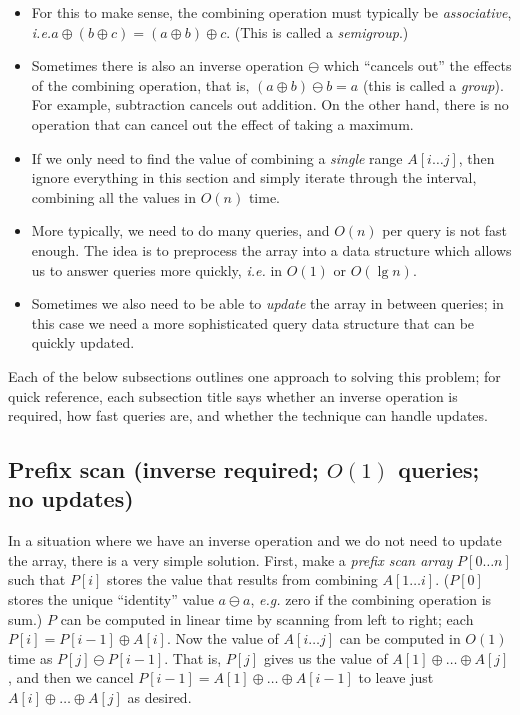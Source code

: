 \documentclass[10pt]{book}
\newcommand{\eg}{\emph{e.g.}\xspace}
\newcommand{\ie}{\emph{i.e.}\xspace}
\begin{document}
\begin{itemize}
\item For this to make sense, the combining operation must typically
  be \emph{associative}, \ie $a \oplus (b \oplus c) = (a \oplus b) \oplus
  c$.  (This is called a \emph{semigroup}.)
\item Sometimes there is also an inverse operation $\ominus$ which
  ``cancels out'' the effects of the combining operation, that is, $(a
  \oplus b) \ominus b = a$ (this is called a \emph{group}).  For
  example, subtraction cancels out addition. On the other hand, there
  is no operation that can cancel out the effect of taking a maximum.
\item If we only need to find the value of combining a \emph{single}
  range $A[i \dots j]$, then ignore everything in this section and
  simply iterate through the interval, combining all the values in
  $O(n)$ time.
\item More typically, we need to do many queries, and $O(n)$ per query
  is not fast enough.  The idea is to preprocess the array into a data
  structure which allows us to answer queries more quickly, \ie in
  $O(1)$ or $O(\lg n)$.
\item Sometimes we also need to be able to \emph{update} the array in
  between queries; in this case we need a more sophisticated query
  data structure that can be quickly updated.
\end{itemize}

Each of the below subsections outlines one approach to solving this
problem; for quick reference, each subsection title says whether an
inverse operation is required, how fast queries are, and whether the
technique can handle updates.

\subsection{Prefix scan (inverse required; $O(1)$ queries; no updates)}

In a situation where we have an inverse operation and we do not need
to update the array, there is a very simple solution.  First, make a
\emph{prefix scan array} $P[0 \dots n]$ such that $P[i]$ stores the
value that results from combining $A[1 \dots i]$.  ($P[0]$ stores the
unique ``identity'' value $a \ominus a$, \eg zero if the combining
operation is sum.)  $P$ can be computed in linear time by scanning
from left to right; each $P[i] = P[i-1] \oplus A[i]$.  Now the value
of $A[i \dots j]$ can be computed in $O(1)$ time as
$P[j] \ominus P[i-1]$. That is, $P[j]$ gives us the value of
$A[1] \oplus \dots \oplus A[j]$, and then we cancel
$P[i-1] = A[1] \oplus \dots \oplus A[i-1]$ to leave just
$A[i] \oplus \dots \oplus A[j]$ as desired.
\end{document}

